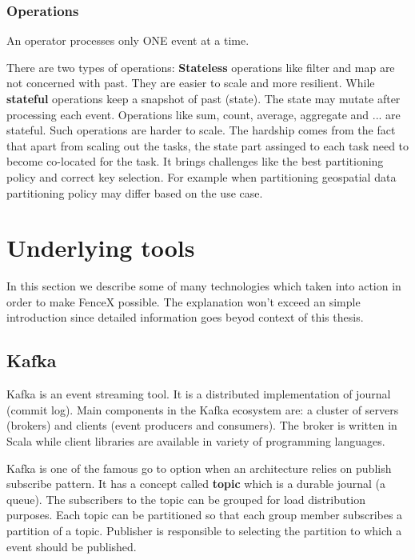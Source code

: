 \documentclass[a4]{report}
\begin{document}
    \subsubsection{Operations}
    An operator processes only ONE event at a time.

    There are two types of operations:
    \textbf{Stateless} operations like filter and map are not concerned with past.
    They are easier to scale and more resilient.
    While \textbf{stateful} operations keep a snapshot of past (state).
    The state may mutate after processing each event.
    Operations like sum, count, average, aggregate and ... are stateful.
    Such operations are harder to scale.
    The hardship comes from the fact that apart from scaling out the tasks, the state part assinged to each task need
    to become co-located for the task.
    It brings challenges like the best partitioning policy and correct key selection.
    For example when partitioning geospatial data partitioning policy may differ based on the use case.

    \section{Underlying tools}
    In this section we describe some of many technologies which taken into action in order to make FenceX possible.
    The explanation won't exceed an simple introduction since detailed information goes beyod context of this thesis.

    \subsection{Kafka \cite{kafka}}
    Kafka is an event streaming tool.
    It is a distributed implementation of journal (commit log).
    Main components in the Kafka ecosystem are: a cluster of servers (brokers) and clients (event producers and consumers).
    The broker is written in Scala while client libraries are available in variety of programming languages.

    Kafka is one of the famous go to option when an architecture relies on publish subscribe pattern.
    It has a concept called \textbf{topic} which is a durable journal (a queue).
    The subscribers to the topic can be grouped for load distribution purposes.
    Each topic can be partitioned so that each group member subscribes a partition of a topic.
    Publisher is responsible to selecting the partition to which a event should be published.
\end{document}
